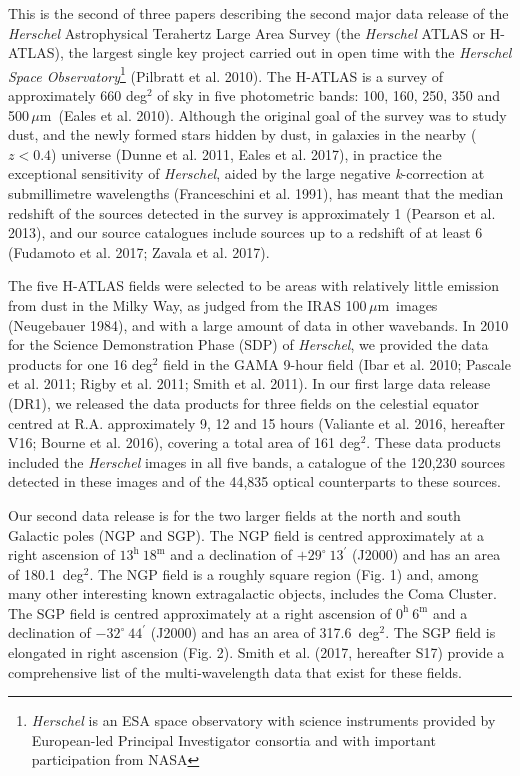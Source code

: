 \documentclass[a4paper,fleqn,usenatbib, twocolumn]{aastex61}
\def\mic{\,$\mu $m}
\begin{document}
This is the second of three papers describing the second major data
release of the {\it Herschel} Astrophysical Terahertz Large Area
Survey (the {\it Herschel} ATLAS or H-ATLAS), the largest single key
project carried out in open time with the {\it Herschel Space
  Observatory}\footnote{{\it Herschel} is an ESA space observatory with
  science instruments provided by European-led Principal Investigator
  consortia and with important participation from NASA} (Pilbratt et
al.  2010).  The H-ATLAS is a survey of approximately 660 deg$^2$ of
sky in five photometric bands: 100, 160, 250, 350 and 500\mic\
(Eales et al.  2010).  Although the original goal of the survey was to
study dust, and the newly formed stars hidden by dust, in galaxies in
the nearby ($z<0.4$) universe (Dunne et al. 2011, Eales et al. 2017),
in practice the exceptional sensitivity of {\it Herschel}, aided by
the large negative {\it k}-correction at submillimetre wavelengths
(Franceschini et al. 1991), has meant that the median redshift of the
sources detected in the survey is approximately 1 (Pearson et
al. 2013), and our source catalogues include sources up to a redshift
of at least 6 (Fudamoto et al. 2017; Zavala et al. 2017).

The five H-ATLAS fields were selected to be areas with relatively
little emission from dust in the Milky Way, as judged from the IRAS
100\mic\ images (Neugebauer 1984), and with a large amount of data
in other wavebands. In 2010 for the Science Demonstration Phase (SDP)
of {\it Herschel}, we provided the data products for one 16 deg$^2$
field in the GAMA 9-hour field (Ibar et al. 2010; Pascale et al. 2011;
Rigby et al. 2011; Smith et al. 2011).  In our first large data
release (DR1), we released the data products for three fields on the
celestial equator centred at R.A. approximately 9, 12 and 15 hours
(Valiante et al. 2016, hereafter V16; Bourne et al.  2016), covering a total area of
161 deg$^2$.  These data products included the {\it Herschel} images
in all five bands, a catalogue of the 120,230 sources detected in
these images and of the 44,835 optical counterparts to these sources.

Our second data release is for the two larger fields at the north and
south Galactic poles (NGP and SGP). The NGP field is centred
approximately at a right ascension of
$13^{\mathrm{h}}\ 18^{\mathrm{m}}$ and a declination of
$+29^{\circ}\ 13^{\prime}$ (J2000) and has an area of 180.1~deg$^2$.
The NGP field is a roughly square region (Fig. 1) and, among many
other interesting known extragalactic objects, includes the Coma
Cluster.  The SGP field is centred approximately at a right ascension
of $ 0^{\mathrm{h}}\ 6^{\mathrm{m}}$ and a declination of
$-32^{\circ} \ 44^{\prime}$ (J2000) and has an area of
317.6~deg$^2$. The SGP field is elongated in right ascension (Fig. 2).
Smith et al. (2017, hereafter S17) provide a comprehensive list of the
multi-wavelength data that exist for these fields.
\end{document}
